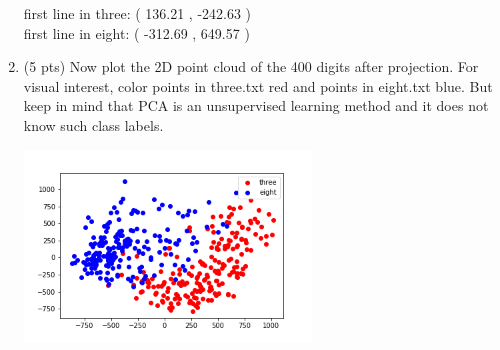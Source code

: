 \documentclass[a4paper]{article}
\theoremstyle{definition}
\newenvironment{soln}{
    \leavevmode\color{blue}\ignorespaces
}{}
\begin{document}
\begin{enumerate}
\begin{soln}
first line in three: ( 136.21 , -242.63 )\\
first line in eight: ( -312.69 , 649.57 )
\end{soln}

\item (5 pts) Now plot the 2D point cloud of the 400 digits after projection.
For visual interest, color points in three.txt red and points in eight.txt blue.
But keep in mind that PCA is an unsupervised learning method and it does not know such class labels.

\begin{soln}
\begin{center}
\includegraphics[width=0.6\textwidth]{q46.png}
\end{center}
\end{soln}
\end{enumerate}
\end{document}
